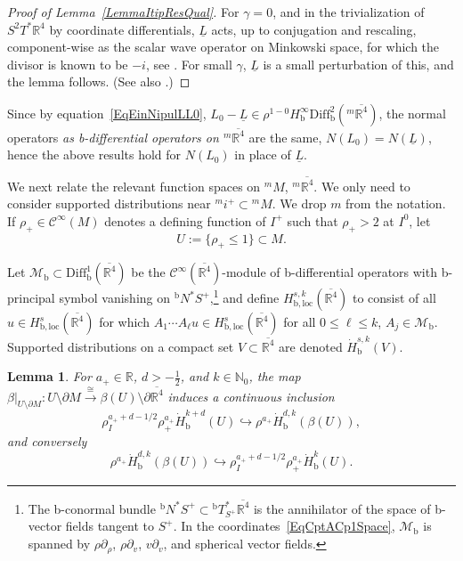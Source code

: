 \documentclass[reqno,11pt,letterpaper]{amsart}
\numberwithin{equation}{section}
\numberwithin{figure}{section}
\newtheorem{lemma}[thm]{Lemma}
\theoremstyle{definition}
\theoremstyle{remark}
\newcommand{\mc}{\mathcal}
\newcommand{\cC}{\mc C}
\newcommand{\cM}{\mc M}
\newcommand{\N}{\mathbb{N}}
\newcommand{\R}{\mathbb{R}}
\newcommand{\hra}{\hookrightarrow}
\newcommand{\ol}{\overline}
\newcommand{\pa}{\partial}
\newcommand{\ul}[1]{\underline{#1}{}}
\newcommand{\xra}{\xrightarrow}
\newcommand{\bop}{{\mathrm{b}}}
\newcommand{\Diff}{\mathrm{Diff}}
\newcommand{\Diffb}{\Diff_\bop}
\newcommand{\Tb}{{}^{\bop}T}
\newcommand{\Nb}{{}^{\bop}N}
\newcommand{\half}{\tfrac{1}{2}}
\newcommand{\loc}{{\mathrm{loc}}}
\newcommand{\CI}{\cC^\infty}
\newcommand{\Hb}{H_{\bop}}
\newcommand{\Hbloc}{H_{\bop,\loc}}
\newcommand{\Hbsupp}{\dot H_{\bop}}
\newcommand{\usref}[1]{{\upshape\ref{#1}}}
\begin{document}
\begin{proof}[Proof of Lemma~\usref{LemmaItipResQual}]
  For $\gamma=0$, and in the trivialization of $S^2 T^*\R^4$ by coordinate differentials, $\ul L$ acts, up to conjugation and rescaling, component-wise as the scalar wave operator on Minkowski space, for which the divisor is known to be $-i$, see \cite[\S10.1]{BaskinVasyWunschRadMink}. For small $\gamma$, $\ul L$ is a small perturbation of this, and the lemma follows. (See also \cite[\S2.7]{VasyMicroKerrdS}.)
\end{proof}

Since by equation~\eqref{EqEinNipulLL0}, $L_0-\ul L\in\rho^{1-0}\Hb^\infty\Diffb^2({}^m\ol{\R^4})$, the normal operators \emph{as b-differential operators on ${}^m\ol{\R^4}$} are the same, $N(L_0)=N(\ul L)$, hence the above results hold for $N(L_0)$ in place of $\ul L$.

We next relate the relevant function spaces on ${}^m\!M$, ${}^m\ol{\R^4}$. We only need to consider supported distributions near ${}^mi^+\subset{}^m\!M$. We drop $m$ from the notation. If $\rho_+\in\CI(M)$ denotes a defining function of $I^+$ such that $\rho_+>2$ at $I^0$, let
\[
  U := \{ \rho_+ \leq 1 \} \subset M.
\]

Let $\cM_\bop\subset\Diffb^1(\ol{\R^4})$ be the $\CI(\ol{\R^4})$-module of b-differential operators with b-principal symbol vanishing on $\Nb^*S^+$,\footnote{The b-conormal bundle $\Nb^*S^+\subset\Tb^*_{S^+}\ol{\R^4}$ is the annihilator of the space of b-vector fields tangent to $S^+$. In the coordinates~\eqref{EqCptACp1Space}, $\cM_\bop$ is spanned by $\rho\pa_\rho$, $\rho\pa_v$, $v\pa_v$, and spherical vector fields.} and define $\Hbloc^{s,k}(\ol{\R^4})$ to consist of all $u\in\Hbloc^s(\ol{\R^4})$ for which $A_1\cdots A_\ell u\in\Hbloc^s(\ol{\R^4})$ for all $0\leq\ell\leq k$, $A_j\in\cM_\bop$. Supported distributions on a compact set $V\subset\ol{\R^4}$ are denoted $\Hbsupp^{s,k}(V)$.

\begin{lemma}
\label{LemmaItipFn}
  For $a_+\in\R$, $d>-\half$, and $k\in\N_0$, the map $\beta|_{U\setminus\pa M}\colon U\setminus\pa M\xra{\cong}\beta(U)\setminus\pa\ol{\R^4}$ induces a continuous inclusion
  \begin{equation}
  \label{EqItipFnBlowDown}
    \rho_I^{a_++d-1/2}\rho_+^{a_+} \Hbsupp^{k+d}(U) \hra \rho^{a_+}\Hbsupp^{d,k}(\beta(U)),
  \end{equation}
  and conversely
  \begin{equation}
  \label{EqItipFnBlowDown2}
    \rho^{a_+}\Hbsupp^{d,k}(\beta(U)) \hra \rho_I^{a_++d-1/2}\rho_+^{a_+}\Hbsupp^k(U).
  \end{equation}
\end{lemma}
\end{document}
